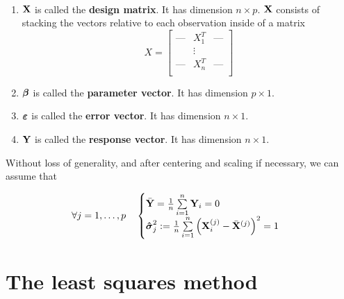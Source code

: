 \begin{definition}\
    \begin{enumerate}[label=(\alph*)]
        \item $\mathbf{X}$ is called the \textbf{design matrix}. It has dimension $n \times p$. $\mathbf{X}$ consists of stacking the vectors relative to each observation inside of a matrix
            \[
                X =
                \begin{bmatrix}
                    \text{---} & X_1^T  & \text{---} \\
                                & \vdots &            \\
                    \text{---} & X_n^T  & \text{---} \\
                \end{bmatrix}
            \]
        \item $\boldsymbol{\beta}$ is called the \textbf{parameter vector}. It has dimension $p \times 1$.
        \item $\boldsymbol{\varepsilon}$ is called the \textbf{error vector}. It has dimension $n \times 1$.
        \item $\mathbf{Y}$ is called the \textbf{response vector}. It has dimension $n \times 1$.
    \end{enumerate}
\end{definition}

Without loss of generality, and after centering and scaling if necessary, we can assume that

\[
    \forall j = 1, \ldots, p \quad
    \begin{cases}
        \bar{\mathbf{Y}} = \frac{1}{n} \sum \limits_{i=1}^{n} \mathbf{Y}_{i} = 0                                                   \\
        \boldsymbol{\hat{\sigma}}_{j}^{2} := \frac{1}{n} \sum \limits_{i=1}^{n} \left( \mathbf{X}_{i}^{(j)} - \bar{\mathbf{X}}^{(j)} \right)^{2} = 1 \\
    \end{cases}
\]

\section{The least squares method}

